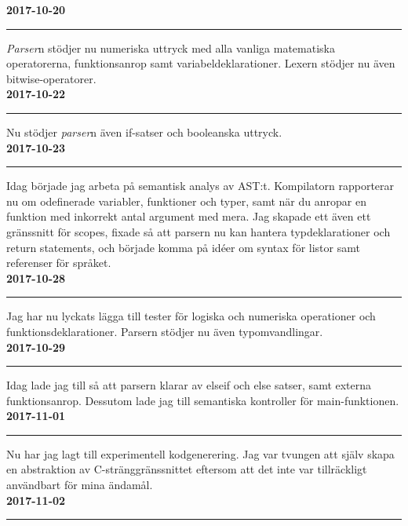 \documentclass{theme}
\begin{document}
\noindent\textbf{2017-10-20}\\
\noindent\rule{\textwidth}{1pt}

\noindent 
\textit{Parser}n stödjer nu numeriska uttryck med alla vanliga matematiska operatorerna,
funktionsanrop samt variabeldeklarationer. Lexern stödjer nu även 
bitwise-operatorer.\\

\noindent\textbf{2017-10-22}\\
\noindent\rule{\textwidth}{1pt}

\noindent 
Nu stödjer \textit{parser}n även if-satser och booleanska uttryck.\\

\noindent\textbf{2017-10-23}\\
\noindent\rule{\textwidth}{1pt}

\noindent 
Idag började jag arbeta på semantisk analys av AST:t. Kompilatorn rapporterar 
nu om odefinerade variabler, funktioner och typer, samt när du anropar en 
funktion med inkorrekt antal argument med mera.  Jag skapade ett även ett 
gränssnitt för scopes, fixade så att parsern nu kan hantera typdeklarationer och
return statements, och började komma på idéer om syntax för listor samt 
referenser för språket. \\

\noindent\textbf{2017-10-28}\\
\noindent\rule{\textwidth}{1pt}

\noindent 
Jag har nu lyckats lägga till tester för logiska och numeriska operationer och
funktionsdeklarationer. Parsern stödjer nu även typomvandlingar.\\

\noindent\textbf{2017-10-29}\\
\noindent\rule{\textwidth}{1pt}

\noindent 
Idag lade jag till så att parsern klarar av elseif och else satser, samt externa
funktionsanrop. Dessutom lade jag till semantiska kontroller för 
main-funktionen.\\

\noindent\textbf{2017-11-01}\\
\noindent\rule{\textwidth}{1pt}

\noindent 
Nu har jag lagt till experimentell kodgenerering. Jag var tvungen att själv 
skapa en abstraktion av C-stränggränssnittet eftersom att det inte var 
tillräckligt användbart för mina ändamål. \\

\noindent\textbf{2017-11-02}\\
\noindent\rule{\textwidth}{1pt}
\end{document}
